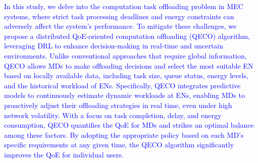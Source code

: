 \documentclass[12pt,draftclsnofoot,onecolumn]{IEEEtran}
\begin{document}
\textcolor{blue}{In this study, we delve into the computation task offloading problem in MEC systems, where strict task processing deadlines and energy constraints can adversely affect the system's performance. To mitigate these challenges, we propose a distributed QoE-oriented computation offloading (QECO) algorithm, leveraging DRL to enhance decision-making in real-time and uncertain environments. Unlike conventional approaches that require global information, QECO allows MDs to make offloading decisions and select the most suitable EN based on locally available data, including task size, queue status, energy levels, and the historical workload of ENs. Specifically, QECO integrates predictive models to continuously estimate dynamic workloads at ENs, enabling MDs to proactively adjust their offloading strategies in real time, even under high network volatility. With a focus on task completion, delay, and energy consumption, QECO quantifies the QoE for MDs and strikes an optimal balance among these factors. By adopting the appropriate policy based on each MD’s specific requirements at any given time, the QECO algorithm significantly improves the QoE for individual users.}




\end{document}
